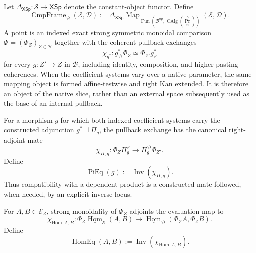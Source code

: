 \begin{definition}
\label{def:prequantum-indexed-comparison-frame}
Let $\Delta_{\mathsf{XSp}}:\mathcal S\to\mathsf{XSp}$ denote the constant-object
functor.  Define
\[
\boxed{
\operatorname{CmpFrame}_{\mathcal B}(\mathcal E,\mathcal D)
:=
\Delta_{\mathsf{XSp}}\operatorname{Map}_{
\operatorname{Fun}(\mathcal B^{\mathrm{op}},
\operatorname{CAlg}(\operatorname{Pr}^{L}_{\mathrm{st}}))}
(\mathcal E,\mathcal D).
}
\]
A point is an indexed exact strong symmetric monoidal comparison
$\Phi=(\Phi_Z)_{Z\in\mathcal B}$ together with the coherent pullback exchanges
\[
\chi_{g^*}:
 g_{\mathcal D}^*\Phi_Z
\simeq
\Phi_{Z'}g_{\mathcal E}^*
\]
for every $g:Z'\to Z$ in $\mathcal B$, including identity, composition, and
higher pasting coherences.
When the coefficient systems vary over a native parameter, the same mapping
object is formed affine-testwise and right Kan extended.  It is therefore an
object of the native slice, rather than an external space subsequently used as
the base of an internal pullback.
\end{definition}

\begin{construction}
\label{constr:prequantum-pi-exchange-realization}
For a morphism $g$ for which both indexed coefficient systems carry the
constructed adjunction $g^*\dashv\Pi_g$, the pullback
exchange has the canonical right-adjoint mate
\[
\boxed{
\chi_{\Pi,g}:
\Phi_Z\Pi_g^{\mathcal E}
\longrightarrow
\Pi_g^{\mathcal D}\Phi_{Z'}.
}
\]
Define
\[
\boxed{
\operatorname{PiEq}(g):=\operatorname{Inv}(\chi_{\Pi,g}).
}
\]
Thus compatibility with a dependent product is a constructed mate followed, when
needed, by an explicit inverse locus.
\end{construction}

\begin{construction}
\label{constr:prequantum-hom-exchange-realization}
For $A,B\in\mathcal E_Z$, strong monoidality of $\Phi_Z$ adjoints the evaluation
map to
\[
\boxed{
\chi_{\mathrm{Hom},A,B}:
\Phi_Z\underline{\operatorname{Hom}}_{\mathcal E}(A,B)
\longrightarrow
\underline{\operatorname{Hom}}_{\mathcal D}(\Phi_ZA,\Phi_ZB).
}
\]
Define
\[
\boxed{
\operatorname{HomEq}(A,B)
:=
\operatorname{Inv}(\chi_{\mathrm{Hom},A,B}).
}
\]
\end{construction}

